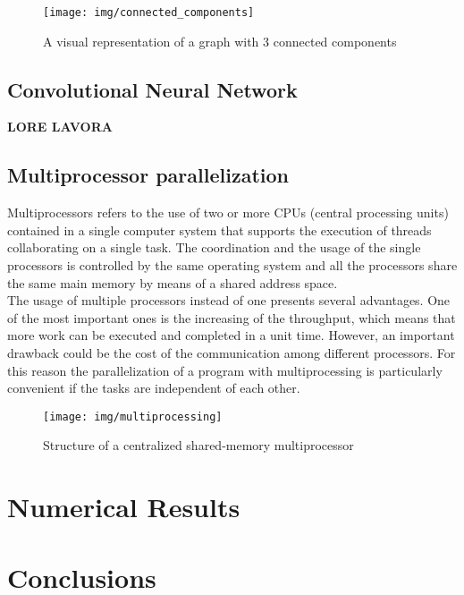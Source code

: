 \documentclass{article}
\begin{document}
{\begin{figure}[h]
	\centering
	\texttt{[image: img/connected\_components]}
	\caption{A visual representation of a graph with 3 connected components}
	\label{fig:2}
\end{figure}


\subsection{Convolutional Neural Network}
\textbf{LORE LAVORA}



\subsection{Multiprocessor parallelization}
Multiprocessors refers to the use of two or more CPUs (central processing units) contained in a single computer system that supports the execution of threads collaborating on a single task. The coordination and the usage of the single processors is controlled by the same operating system and all the processors share the same main memory by means of a shared address space.  \\
The usage of multiple processors instead of one presents several advantages. One of the most important ones is the increasing of the  throughput, which means that more work can be executed and completed in a unit time. However, an important drawback could be the cost of the communication among different processors. For this reason the parallelization of a program with multiprocessing is particularly convenient if the tasks are independent of each other.

\begin{figure}[h]
	\centering
	\texttt{[image: img/multiprocessing]}
	\caption{Structure of a centralized shared-memory multiprocessor}
	\label{fig:3}
\end{figure}



\section{Numerical Results}
 

\section{Conclusions}

}
\end{document}
